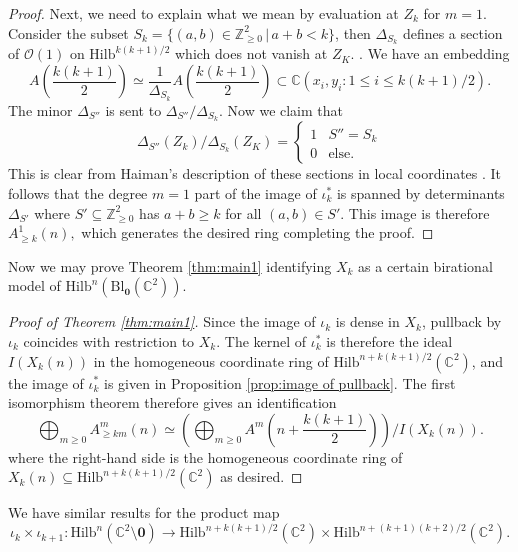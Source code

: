 \documentclass[12pt]{amsart}
\newcommand{\Hilb}{\mathrm{Hilb}}
\newcommand{\C}{\mathbb{C}}
\newcommand{\Z}{\mathbb{Z}}
\newcommand{\CO}{\mathcal{O}}
\newcommand{\Bl}{\mathrm{Bl}}
\numberwithin{equation}{section}
\theoremstyle{definition}
\begin{document}
\begin{proof}
    Next, we need to explain what we mean by evaluation at $Z_k$ for $m=1$. Consider the subset $S_k=\{ (a,b)\in \Z^2_{\geq 0} \,|\, a+b< k \}$, then $\Delta_{S_k}$ defines a section of $\CO(1)$ on $\Hilb^{k(k+1)/2}$ which does not vanish at $Z_K$.
.   We have an embedding 
    $$
    A\left(\frac{k(k+1)}{2}\right)\simeq \frac{1}{\Delta_{S_k}}A\left(\frac{k(k+1)}{2}\right)\subset \C\left(x_i,y_i:1\le i\le k(k+1)/2\right).
    $$
    The minor $\Delta_{S''}$ is sent to $\Delta_{S''}/\Delta_{S_k}$.
    Now we claim that 
    \[ \Delta_{S''}(Z_k)/\Delta_{S_k}(Z_K) = \begin{cases}
        1 & S'' = S_k
        \\
        0 & \text{else}.
    \end{cases} \]
    This is clear from Haiman's description of these sections in local coordinates \cite{Haimanqt}. It follows that the degree $m=1$ part of the image of $\iota_k^*$ is spanned by determinants $\Delta_{S'}$ where $S'\subseteq \Z^2_{\geq 0}$ has $a+b\geq k$ for all $(a,b)\in S'$. This image is therefore $A^1_{\geq k}(n),$ which generates the desired ring completing the proof.
\end{proof}

Now we may prove Theorem \ref{thm:main1} identifying $X_k$ as a certain birational model of $\Hilb^n(\Bl_{\mathbf{0}}(\C^2))$.

\begin{proof}[Proof of Theorem \ref{thm:main1}]
    Since the image of $\iota_k$ is dense in $X_k$, pullback by $\iota_k$ coincides with restriction to $X_k$. The kernel of $\iota_k^*$ is therefore the ideal $I(X_k(n))$ in the homogeneous coordinate ring of $\Hilb^{n+k(k+1)/2}(\C^2)$, and the image of $\iota_k^*$ is given in Proposition \ref{prop:image of pullback}. The first isomorphism theorem therefore gives an identification 
    \[ \bigoplus_{m\geq 0}A^m_{\geq km}(n) \simeq \left(\bigoplus_{m\geq 0} A^m\left( n+\frac{k(k+1)}{2} \right)\right) \bigg/ I(X_k(n)). \]
    where the right-hand side is the homogeneous coordinate ring of $X_k(n) \subseteq \Hilb^{n+k(k+1)/2}(\C^2)$ as desired.
\end{proof}

We have similar results for the product map
\[ \iota_k\times\iota_{k+1}:\Hilb^n(\C^2\setminus\mathbf{0})\to \Hilb^{n+k(k+1)/2}(\C^2)\times \Hilb^{n+(k+1)(k+2)/2}(\C^2). \]
\end{document}
